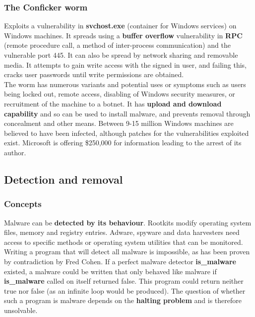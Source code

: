 \documentclass{article}
\newcommand{\np}{\vspace{8pt} \\}
\begin{document}
\subsubsection{The Conficker worm}
Exploits a vulnerability in \textbf{svchost.exe} (container for Windows services) on Windows machines. It spreads using a \textbf{buffer overflow} vulnerability in \textbf{RPC} (remote procedure call, a method of inter-process communication) and the vulnerable port 445. It can also be spread by network sharing and removable media. It attempts to gain write access with the signed in user, and failing this, cracks user passwords until write permissions are obtained. \np
The worm has numerous variants and potential uses or symptoms such as users being locked out, remote access, disabling of Windows security measures, or recruitment of the machine to a botnet. It has \textbf{upload and download capability} and so can be used to install malware, and prevents removal through concealment and other means. Between 9-15 million Windows machines are believed to have been infected, although patches for the vulnerabilities exploited exist. Microsoft is offering \$250,000 for information leading to the arrest of its author.

\subsection{Detection and removal}

\subsubsection{Concepts}
Malware can be \textbf{detected by its behaviour}. Rootkits modify operating system files, memory and registry entries. Adware, spyware and data harvesters need access to specific methods or operating system utilities that can be monitored. \np
Writing a program that will detect all malware is impossible, as has been proven by contradiction by Fred Cohen. If a perfect malware detector \textbf{is\_malware} existed, a malware could be written that only behaved like malware if \textbf{is\_malware} called on itself returned false. This program could return neither true nor false (as an infinite loop would be produced). The question of whether such a program is malware depends on the \textbf{halting problem} and is therefore unsolvable.
\end{document}
